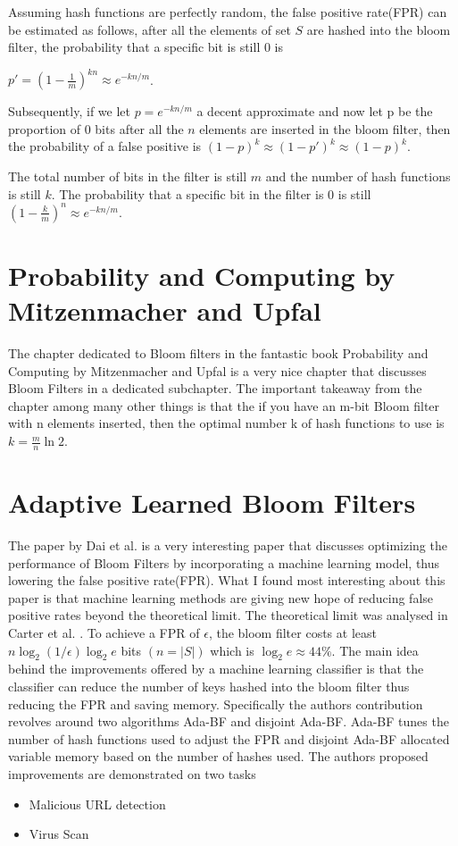 \documentclass[MScCS]{uccthesis}
\begin{document}
Assuming hash functions are perfectly random, the false positive rate(FPR) can be estimated as follows, after all the elements of set $S$ are hashed into the bloom filter, the probability that a specific bit is still 0 is

$ p ' = (1 - \frac{1}{m})^{kn} \approx e ^{-kn/m}$.

Subsequently, if we let $p = e ^{-kn/m}$ a decent approximate and now let p be the proportion of 0 bits after all the $n$ elements are inserted in the bloom filter, then the probability of a false positive is $(1-p)^k \approx (1-p')^k \approx (1-p)^k$.

The total number of bits in the filter is still $m$ and the number of hash functions is still $k$. The probability that a specific bit in the filter is 0 is still $(1-\frac{k}{m})^n \approx e^{-kn/m}$.


\section{Probability and Computing by Mitzenmacher and Upfal}
The chapter dedicated to Bloom filters in the fantastic book Probability and Computing by Mitzenmacher and Upfal \cite{mitzenmacher2017probability} is a very nice chapter that discusses Bloom Filters in a dedicated subchapter. The important takeaway from the chapter among many other things is that the if you have an m-bit Bloom filter with n elements inserted, then the optimal number k of hash functions to use is $k = \frac{m}{n}\ln 2$.

\section{Adaptive Learned Bloom Filters}
The paper by Dai et al. \cite{dai2019adaptive} is a very interesting paper that discusses optimizing the performance of Bloom Filters by incorporating a machine learning model, thus lowering the false positive rate(FPR). What I found most interesting about this paper is that machine learning methods are giving new hope of reducing false positive rates beyond the theoretical limit. The theoretical limit was analysed in Carter et al. \cite{carter1978exact}. To achieve a FPR of $ \epsilon $, the bloom filter costs at least $ n \log_2 (1/\epsilon)\log_2 e$ bits $(n = |S|)$ which is $\log_2 e \approx 44\%$. The main idea behind the improvements offered by a machine learning classifier is that the classifier can reduce the number of keys hashed into the bloom filter thus reducing the FPR and saving memory. Specifically the authors contribution revolves around two algorithms Ada-BF and disjoint Ada-BF. Ada-BF tunes the number of hash functions used to adjust the FPR and disjoint Ada-BF allocated variable memory based on the number of hashes used. The authors proposed improvements are demonstrated on two tasks
\begin{itemize}
    \item Malicious URL detection
    \item Virus Scan
\end{itemize}
\end{document}
